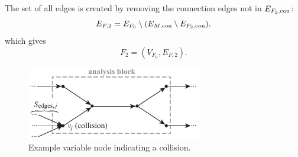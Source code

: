 \begin{description}
\begin{equation}
    \end{equation}
The set of all edges is created by removing the connection edges not in $E_{F_2,\textrm{con}}$:
    \begin{equation}
    E_{F,2} = E_{F_0} \setminus (E_{M,\textrm{con}} \setminus E_{F_2,\textrm{con}}),
    \end{equation}
    which gives
    \begin{equation}
    F_2 = (V_{F_0},E_{F,2}).
    \end{equation}
    \begin{figure}[htb!]
        \begin{center}
        \includegraphics[width=3in]{images/analysis_block_collision}
        \end{center}
        \vspace{-20pt}
    \caption{Example variable node indicating a collision.}
    \label{f:collision}
    \end{figure}


\end{description}
